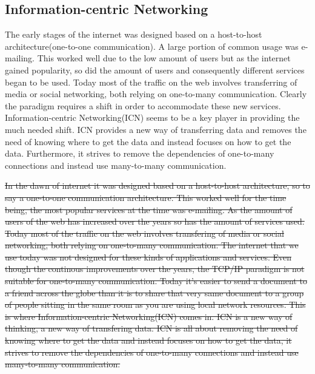 \subsection{Information-centric Networking}

The early stages of the internet was designed based on a host-to-host architecture(one-to-one communication). A large portion of common usage was e-mailing. This worked well due to the low amount of users but as the internet gained popularity, so did the amount of users and consequently different services began to be used. Today most of the traffic on the web involves transferring of media or social networking, both relying on one-to-many communication. Clearly the paradigm requires a shift in order to accommodate these new services. Information-centric Networking(ICN) seems to be a key player in providing the much needed shift. ICN provides a new way of transferring data and removes the need of knowing where to get the data and instead focuses on how to get the data\cite{ICNarticle}. Furthermore, it strives to remove the dependencies of one-to-many connections and instead use many-to-many communication.

\sout{In the dawn of internet it was designed based on a host-to-host architecture, so to say a one-to-one communication architecture. This worked well for the time being, the most popular services at the time was e-mailing. As the amount of users of the web has increased over the years so has the amount of services used. Today most of the traffic on the web involves transfering of media or social networking, both relying on one-to-many communication. The internet that we use today was not designed for these kinds of applications and services. 
Even though the continous improvements over the years, the TCP/IP paradigm is not suitable for one-to-many communication. 
Today it's easier to send a document to a friend across the globe than it is to share that very same document to a group of people sitting in the same room as you are using local network resources\cite{ICNarticle}.
This is where Information-centric Networking(ICN) comes in. ICN is a new way of thinking, a new way of transfering data. ICN is all about removing the need of knowing where to get the data and instead focuses on how to get the data\cite{ICNarticle}, it strives to remove the dependencies of one-to-many connections and instead use many-to-many communication.}


